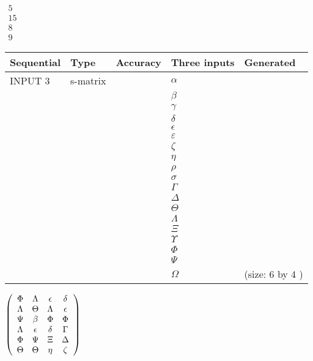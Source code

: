 \documentclass[12pt]{article}
\begin{document}
   
 $\begin{array}{
 c
 }
 5  \\ 
 15  \\ 
 8  \\ 
 9
\end{array}  $ 
  
  
\noindent\begin{tabular}{|l|l|l|l|l|}
\hline
 Sequential & Type & Accuracy & Three inputs & Generated \\ 
\hline
 
 
  INPUT $  3 $ & s-matrix & & 
 $  \alpha $ & 
  \\
  & & & 
 $  \beta $ & 
  \\
  & & & 
 $  \gamma $ & 
  \\
  & & & 
 $  \delta $ & 
  \\
  & & & 
 $  \epsilon $ & 
  \\
  & & & 
 $  \varepsilon $ & 
  \\
  & & & 
 $                     \zeta $ & 
  \\
  & & & 
 $  \eta $ & 
  \\
  & & & 
 $  \rho $ & 
  \\
  & & & 
 $  \sigma $ & 
  \\
  & & & 
 $  \Gamma $ & 
  \\
  & & & 
 $  \Delta $ & 
  \\
  & & & 
 $  \Theta $ & 
  \\
  & & & 
 $  \Lambda $ & 
  \\
  & & & 
 $                     \Xi $ & 
  \\
  & & & 
 $  \Upsilon $ & 
  \\
  & & & 
 $  \Phi $ & 
  \\
  & & & 
 $  \Psi $ & 
  \\
  & & & 
 $  \Omega $ & 
  (size:  6  by  4 )
 \\  \hline  
 \end{tabular}
   
   
 $  \left( \begin{array}
 {
 c
 c
 c
 c
 }
 \Phi & 
 \Lambda & 
 \epsilon & 
 \delta \\ 
 \Lambda & 
 \Theta & 
 \Lambda & 
 \epsilon \\ 
 \Psi & 
 \beta & 
 \Phi & 
 \Phi \\ 
 \Lambda & 
 \epsilon & 
 \delta & 
 \Gamma \\ 
 \Phi & 
 \Psi & 
                    \Xi & 
 \Delta \\ 
 \Theta & 
 \Theta & 
 \eta & 
                    \zeta
 \end{array} \right) $ 
  
\end{document}
